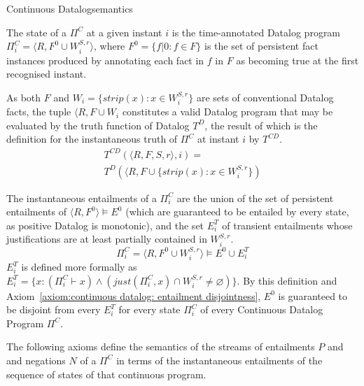 \begin{nestedsection}{Continuous Datalog}{semantics}
\begin{definition}[State of a $\Pi^C$]\label{def:continuous datalog: CDPt}
The state of a $\Pi^C$ at a given instant $i$ is the time-annotated
Datalog program ${\Pi^C_i = \langle R, F^0 \cup W^{S,r}_{i} \rangle}$,
where ${F^0 = \{ f | 0 : f \in F \}}$ is the set of persistent fact instances produced by
annotating each fact in $f$ in $F$ as becoming true at the first recognised instant.

As both $F$ and ${W_i = \{ strip(x) : x \in W^{S,r}_{i} \}}$ are sets of conventional
Datalog facts, the tuple ${\langle R, F \cup W_i}$
constitutes a valid Datalog program that may be evaluated by the truth
function of Datalog $T^{D}$, the result of which is the definition for the
instantaneous truth of $\Pi^C$ at instant $i$ by $T^{CD}$.
\begin{multline*}
T^{CD} \left( \langle R, F, S, r \rangle, i \right) = \\
	T^{D} \left( \langle R, F \cup \{ strip(x) : x \in W^{S,r}_{i} \} \right)
\end{multline*}

The instantaneous entailments of a $\Pi^C_i$ are the union of the set of
persistent entailments of ${\langle R, F^0 \rangle \vDash E^0}$ (which are
guaranteed to be entailed by every state, as positive Datalog is monotonic),
and the set $E^T_{i}$ of transient entailments whose justifications are at
least partially contained in $W^{S,r}_i$.
\begin{equation*}
\Pi^C_i = \langle R, F^0 \cup W^{S,r}_{i} \rangle \vDash E^0 \cup E^T_{i}
\end{equation*}
$E^T_i$ is defined more formally as
${E^T_{i} = \{ x : \left( \Pi^C_i \vdash x \right) \wedge
\left( just(\Pi^C_i,x) \cap W^{S,r}_i \neq \varnothing \right) \}}$.
By this definition and Axiom~\ref{axiom:continuous datalog: entailment disjointness},
$E^0$ is guaranteed to be disjoint from every $E^T_i$
for every state $\Pi^C_i$ of every Continuous Datalog Program $\Pi^C$.
\end{definition}

The following axioms define the semantics of the streams of
entailments $P$ and and negations $N$ of a $\Pi^C$ in terms of the
instantaneous entailments of the sequence of states of that continuous
program.


\end{nestedsection}
